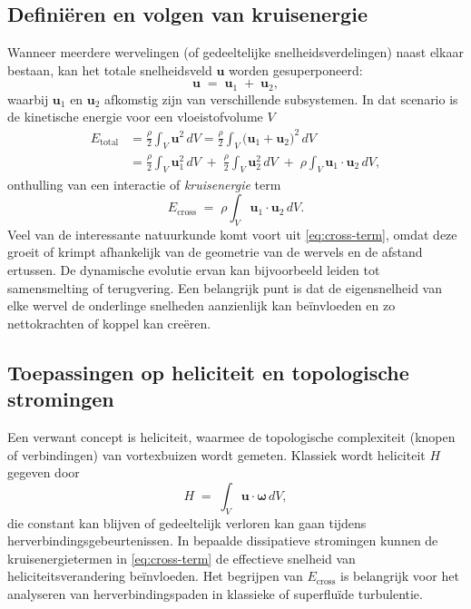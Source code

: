 \subsection{Definiëren en volgen van kruisenergie}
\label{sec:cross}
Wanneer meerdere wervelingen (of gedeeltelijke snelheidsverdelingen) naast elkaar bestaan, kan het totale snelheidsveld $\mathbf{u}$ worden gesuperponeerd:
\begin{equation}
\mathbf{u} \;=\; \mathbf{u}_1 \;+\;\mathbf{u}_2,\label{eq:appendix:superpose}
\end{equation}
waarbij $\mathbf{u}_1$ en $\mathbf{u}_2$ afkomstig zijn van verschillende subsystemen. In dat
scenario is de kinetische energie voor een vloeistofvolume $V$
\begin{align}
E_{\text{total}} &= \frac{\rho}{2} \int_V \mathbf{u}^2 \,dV
= \frac{\rho}{2} \int_V \bigl(\mathbf{u}_1 + \mathbf{u}_2 \bigr)^2\, dV \\
&= \frac{\rho}{2} \int_V \mathbf{u}_1^2 \,dV \;+\;\frac{\rho}{2} \int_V \mathbf{u}_2^2 \,dV
\;+\;\rho \int_V \mathbf{u}_1 \cdot \mathbf{u}_2 \, dV,
\end{align}
onthulling van een interactie of \emph{kruisenergie} term
\begin{equation}
E_{\text{cross}} \;=\; \rho \int_V \mathbf{u}_1 \cdot \mathbf{u}_2 \, dV.
\label{eq:cross-term}
\end{equation}
Veel van de interessante natuurkunde komt voort uit \eqref{eq:cross-term}, omdat deze
groeit of krimpt afhankelijk van de geometrie van de wervels en de afstand ertussen.
De dynamische evolutie ervan kan bijvoorbeeld leiden tot samensmelting of terugvering. Een belangrijk punt is dat
de eigensnelheid van elke wervel de onderlinge snelheden aanzienlijk kan beïnvloeden en zo
nettokrachten of koppel kan creëren.
\subsection{Toepassingen op heliciteit en topologische stromingen}
\label{sec:helicity}
Een verwant concept is heliciteit, waarmee de topologische complexiteit (knopen of
verbindingen) van vortexbuizen wordt gemeten. Klassiek wordt heliciteit $H$ gegeven door
\begin{equation}
H \;=\; \int_V \mathbf{u} \cdot \boldsymbol{\omega}\, dV,\label{eq:appendix:helicity}
\end{equation}
die constant kan blijven of gedeeltelijk verloren kan gaan tijdens herverbindingsgebeurtenissen. In bepaalde
dissipatieve stromingen kunnen de kruisenergietermen in \eqref{eq:cross-term} de effectieve snelheid van heliciteitsverandering beïnvloeden. Het begrijpen van $E_{\text{cross}}$ is belangrijk
voor het analyseren van herverbindingspaden in klassieke of superfluïde turbulentie.

